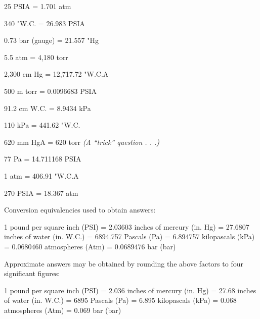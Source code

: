 {{{{{{{{{{{{






\medskip
{\item{} 25 PSIA = 1.701 atm
\vskip 5pt
{\item{} 340 "W.C. = 26.983 PSIA
\vskip 5pt
{\item{} 0.73 bar (gauge) = 21.557 "Hg
\vskip 5pt
{\item{} 5.5 atm = 4,180 torr
\vskip 5pt
{\item{} 2,300 cm Hg = 12,717.72 "W.C.A
\vskip 5pt
{\item{} 500 m torr = 0.0096683 PSIA
\vskip 5pt
{\item{} 91.2 cm W.C. = 8.9434 kPa
\vskip 5pt
{\item{} 110 kPa = 441.62 "W.C.
\vskip 5pt
{\item{} 620 mm HgA = 620 torr {\it (A ``trick'' question . . .)}
\vskip 5pt
{\item{} 77 Pa = 14.711168 PSIA
\vskip 5pt
{\item{} 1 atm = 406.91 "W.C.A
\vskip 5pt
{\item{} 270 PSIA = 18.367 atm
\medskip







Conversion equivalencies used to obtain answers:

\vskip 10pt

\vskip 10pt {\narrower \noindent \baselineskip5pt

1 pound per square inch (PSI) = 2.03603 inches of mercury (in. Hg) = 27.6807 inches of water (in. W.C.) = 6894.757 Pascals (Pa) = 6.894757 kilopascals (kPa) = 0.0680460 atmospheres (Atm) = 0.0689476 bar (bar)

\par} \vskip 10pt

\vskip 10pt

Approximate answers may be obtained by rounding the above factors to four significant figures:

\vskip 10pt

\vskip 10pt {\narrower \noindent \baselineskip5pt

1 pound per square inch (PSI) = 2.036 inches of mercury (in. Hg) = 27.68 inches of water (in. W.C.) = 6895 Pascals (Pa) = 6.895 kilopascals (kPa) = 0.068 atmospheres (Atm) = 0.069 bar (bar)

}}}}}}}}}}}}}}}}}}}}}}}}}
